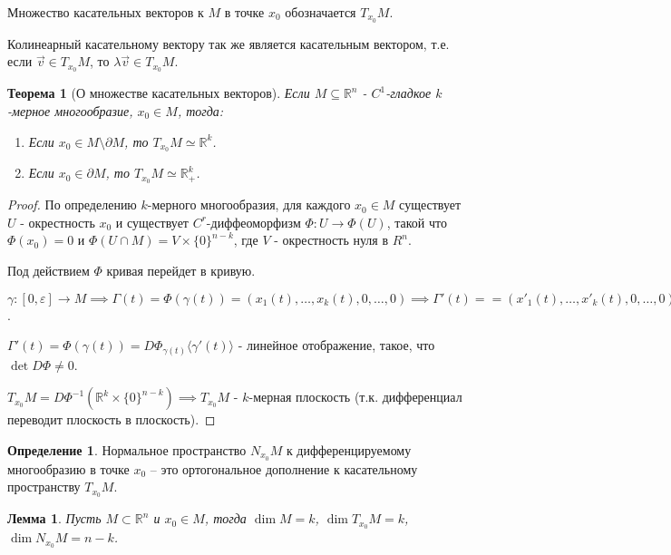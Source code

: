 \documentclass[a5paper]{article}
\newcounter{through}
\theoremstyle{plain}
\newtheorem{theorem}[through]{Теорема}
\newtheorem{lemma}[through]{Лемма}
\theoremstyle{definition}
\newtheorem{definition}[through]{Определение}
\numberwithin{through}{section}
\numberwithin{equation}{section}
\begin{document}
Множество касательных векторов к $M$ в точке $x_0$ обозначается $T_{x_0}M$.

Колинеарный касательному вектору так же является касательным вектором, т.е. 
если $\vec{v} \in T_{x_0}M$, то $\lambda \vec{v} \in T_{x_0}M$.

\begin{theorem}[О множестве касательных векторов]
	Если $M \subseteq \mathbb{R}^n$ - $C^1$-гладкое $k$-мерное многообразие,
	$x_0 \in M$, тогда:
	
	\begin{enumerate}
		\item 
		Если $x_0 \in M \setminus \partial M$, то $T_{x_0}M \simeq 
		\mathbb{R}^k$.
		
		\item 
		Если $x_0 \in \partial M$, то $T_{x_0}M \simeq 
		\mathbb{R}_+^k$.
	\end{enumerate}
\end{theorem}

\begin{proof}
	По определению $k$-мерного многообразия, для каждого $x_0 \in M$ существует $U$ - окрестность $x_0$ и существует $ C^r$-диффеоморфизм $\Phi : U \to \Phi (U)$, такой что $\Phi(x_0)=0$ и $\Phi(U \cap M) = V \times \{0\}^{n-k}$, где $V$ - окрестность нуля в $R^n$.
	
	Под действием $\Phi$ кривая перейдет в кривую.
	
	$\gamma : [0, \varepsilon] \to M \implies \Gamma(t) = 
	\Phi(\gamma(t)) = (x_1(t), \ldots, x_k(t), 0, \ldots, 0) 
	\implies \Gamma'(t) = =(x'_1(t), \ldots, x'_k(t), 0, \ldots, 0)$.
	
	$\Gamma'(t) = \Phi(\gamma(t)) = D \Phi_{\gamma(t)} \langle\gamma'(t)\rangle$ -
	линейное отображение, такое, что $\det D \Phi \not = 0$.
	
	$T_{x_0}M = D \Phi^{-1} (\mathbb{R}^k \times \{0\}^{n-k}) \implies T_{x_0}M$ - $k$-мерная плоскость (т.к. дифференциал переводит плоскость в плоскость). 
\end{proof}

\begin{definition}
	Нормальное пространство $N_{x_0}M$ к дифференцируемому многообразию в точке $x_0$ -- это ортогональное дополнение к касательному пространству $T_{x_0}M$.
\end{definition}

\begin{lemma}
	Пусть $M \subset \mathbb{R}^n$ и $x_0 \in M$, тогда $\dim M = k$, 
	$\dim T_{x_0}M = k$, $\dim N_{x_0}M = n - k$.
\end{lemma}
\end{document}
